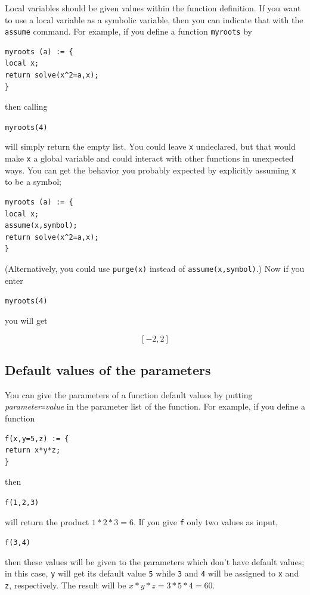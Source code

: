 \documentclass[a4paper,11pt]{book}
\begin{document}
Local variables should be given values within the function definition.
If you want to use a local variable as a symbolic variable, then you
can indicate that with the \texttt{assume} command.  For
example, if you define a function \texttt{myroots} by
\begin{verbatim}
myroots (a) := {
local x;
return solve(x^2=a,x);
}
\end{verbatim}
then calling
\begin{center}
{\tt myroots(4)}
\end{center}
will simply return the empty list.  You could leave \texttt{x}
undeclared, but that would make \texttt{x} a global variable and could
interact with other functions in unexpected ways.  You can get the
behavior you probably expected by explicitly assuming \texttt{x} to be a
symbol; 
\begin{verbatim}
myroots (a) := {
local x;
assume(x,symbol);
return solve(x^2=a,x);
}
\end{verbatim}
(Alternatively, you could use \texttt{purge(x)} instead
of \texttt{assume(x,symbol)}.) Now if you enter
\begin{center}
{\tt myroots(4)}
\end{center}
you will get
\begin{center}
  \[ [-2,2]\]
\end{center}

\subsection{Default values of the parameters}

You can give the parameters of a function default values by putting 
\textit{parameter}\texttt{=}\textit{value} in the parameter list of
the function.  For example, if you define a function
\begin{verbatim}
f(x,y=5,z) := {
return x*y*z;
}
\end{verbatim}
then
\begin{center}
{\tt f(1,2,3)}
\end{center}
will return the product $1*2*3=6$.  If you give \texttt{f} only two
values as input,
\begin{center}
{\tt f(3,4)}
\end{center}
then these values will be given to the parameters which don't have default
values; in this case, \texttt{y} will get its default value \texttt{5} while
\texttt{3} and \texttt{4} will be assigned to \texttt{x} and
\texttt{z}, respectively.  The result will be $x*y*z=3*5*4=60$.
\end{document}
